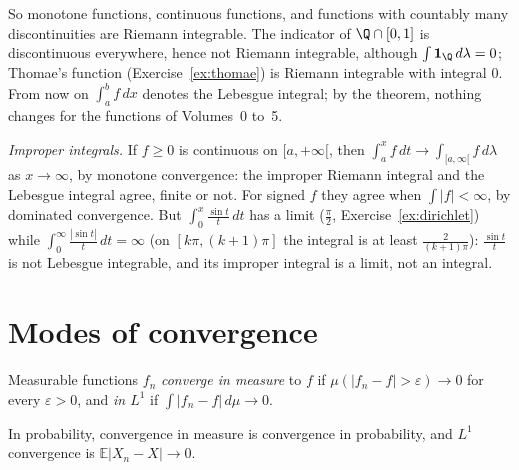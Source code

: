 So monotone functions, continuous functions, and functions with countably many discontinuities are Riemann integrable. The indicator of
$\Q\cap[0,1]$ is discontinuous everywhere, hence not Riemann integrable, although $\int\mathbf 1_\Q\,d\lambda=0$; Thomae's function (Exercise~\ref{ex:thomae}) is Riemann
integrable with integral $0$. From now on $\int_a^bf\,dx$ denotes the Lebesgue integral; by the theorem, nothing changes for the functions of Volumes~0 to~5.

\emph{Improper integrals.} If $f\ge0$ is continuous on $[a,+\infty[$, then $\int_a^xf\,dt\to\int_{[a,\infty[}f\,d\lambda$ as $x\to\infty$, by monotone convergence: the improper Riemann integral and the Lebesgue integral
agree, finite or not. For signed $f$ they agree when $\int|f|<\infty$, by dominated convergence. But $\int_0^x\frac{\sin t}t\,dt$ has a limit ($\frac\pi2$, Exercise~\ref{ex:dirichlet}) while
$\int_0^\infty\frac{|\sin t|}t\,dt=\infty$ (on $[k\pi,(k+1)\pi]$ the integral is at least $\frac2{(k+1)\pi}$): $\frac{\sin t}t$ is not Lebesgue integrable, and its improper integral is a limit, not an integral.

\section{Modes of convergence}

\begin{definition}
Measurable functions $f_n$ \emph{converge in measure} to $f$ if $\mu(|f_n-f|>\varepsilon)\to0$ for every $\varepsilon>0$, and \emph{in $L^1$} if $\int|f_n-f|\,d\mu\to0$.
\end{definition}

In probability, convergence in measure is convergence in probability, and $L^1$ convergence is $\mathbb E|X_n-X|\to0$.

